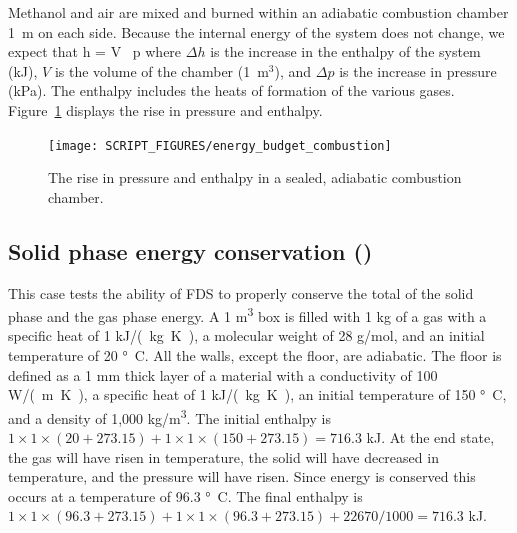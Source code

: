 \documentclass[11pt]{book}
\begin{document}
Methanol and air are mixed and burned within an adiabatic combustion chamber 1~m on each side. Because the internal energy of the system does not change, we expect that
\be
\Delta h = V \, \Delta p
\ee
where $\Delta h$ is the increase in the enthalpy of the system (kJ), $V$ is the volume of the chamber (1~m$^3$), and $\Delta p$ is the increase in pressure (kPa). The enthalpy includes the heats of formation of the various gases. Figure~\ref{fig_energy_budget_combustion} displays the rise in pressure and enthalpy.
\begin{figure}[ht]
\centering
\texttt{[image: SCRIPT\_FIGURES/energy\_budget\_combustion]}
\caption[The  test case]{The rise in pressure and enthalpy in a sealed, adiabatic combustion chamber.}
\label{fig_energy_budget_combustion}
\end{figure}



\subsection{Solid phase energy conservation (\texorpdfstring{}{energy\_budget\_solid})}
\label{energy_budget_solid}

This case tests the ability of FDS to properly conserve the total of the solid phase and the gas phase energy.  A 1 \si{m^3} box is filled with 1 kg of a gas with a specific heat of 1 \si{kJ/(kg.K)}, a molecular weight of 28 g/mol, and an initial temperature of 20 \si{\degree C}.  All the walls, except the floor, are adiabatic.  The floor is defined as a 1 mm thick layer of a material with a conductivity of 100 \si{W/(m.K)},  a specific heat of 1 \si{kJ/(kg.K)}, an initial temperature of 150 \si{\degree C}, and a density of 1,000 \si{kg/m^3}.  The initial enthalpy is $1 \times 1 \times (20+273.15) + 1 \times 1 \times (150+273.15)  =  716.3$ kJ.  At the end state, the gas will have risen in temperature, the solid will have decreased in temperature, and the pressure will have risen.  Since energy is conserved this occurs at a temperature of 96.3 \si{\degree C}.  The final enthalpy is $1 \times 1 \times (96.3+273.15) + 1 \times 1 \times (96.3+273.15) + 22670 / 1000  =  716.3$ kJ.
\end{document}
